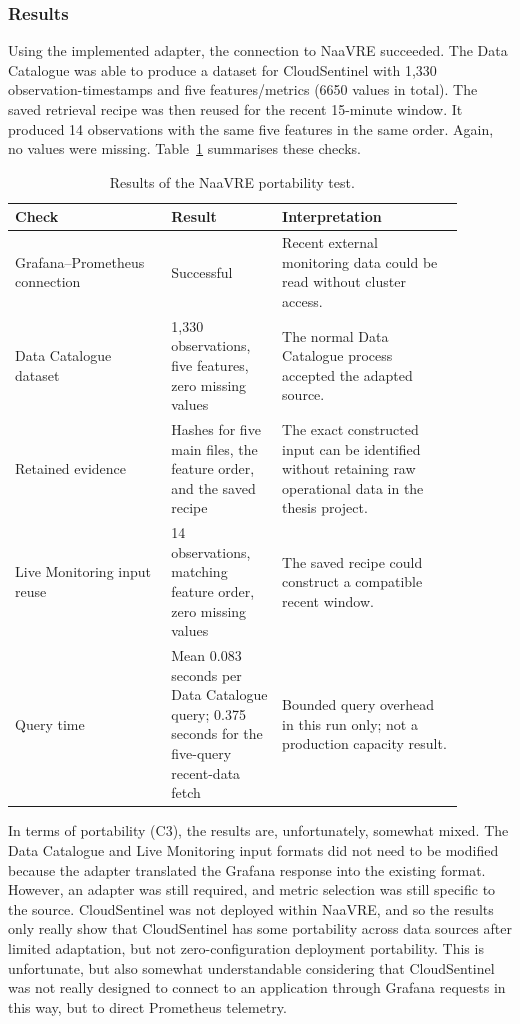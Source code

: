 \subsubsection{Results}

Using the implemented adapter, the connection to NaaVRE succeeded. The Data Catalogue was able to produce a dataset for CloudSentinel with 1,330 observation-timestamps and five features/metrics (6650 values in total). The saved retrieval recipe was then reused for the recent 15-minute window. It produced 14 observations with the same five features in the same order. Again, no values were missing. Table~\ref{tab:h9-naavre-results} summarises these checks.

\begin{table}[H]
    \centering
    \small
    \caption{Results of the NaaVRE portability test.}
    \label{tab:h9-naavre-results}
    \begin{tabular}{|p{0.31\linewidth}|p{0.22\linewidth}|p{0.36\linewidth}|}
        \hline
        Check & Result & Interpretation \\
        \hline
        Grafana--Prometheus connection & Successful & Recent external monitoring data could be read without cluster access. \\
        \hline
        Data Catalogue dataset & 1,330 observations, five features, zero missing values & The normal Data Catalogue process accepted the adapted source. \\
        \hline
        Retained evidence & Hashes for five main files, the feature order, and the saved recipe & The exact constructed input can be identified without retaining raw operational data in the thesis project. \\
        \hline
        Live Monitoring input reuse & 14 observations, matching feature order, zero missing values & The saved recipe could construct a compatible recent window. \\
        \hline
        Query time & Mean 0.083 seconds per Data Catalogue query; 0.375 seconds for the five-query recent-data fetch & Bounded query overhead in this run only; not a production capacity result. \\
        \hline
    \end{tabular}
\end{table}

In terms of portability (C3), the results are, unfortunately, somewhat mixed. The Data Catalogue and Live Monitoring input formats did not need to be modified because the adapter translated the Grafana response into the existing format. However, an adapter was still required, and metric selection was still specific to the source. CloudSentinel was not deployed within NaaVRE, and so the results only really show that CloudSentinel has some portability across data sources after limited adaptation, but not zero-configuration deployment portability. This is unfortunate, but also somewhat understandable considering that CloudSentinel was not really designed to connect to an application through Grafana requests in this way, but to direct Prometheus telemetry.

